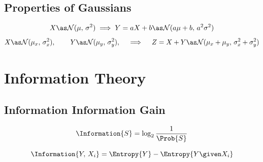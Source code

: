 \documentclass[18pt,a3paper,landscape, ncols=3]{cheatsheet}
\begin{document}
	\subsection{Properties of Gaussians}
		\begin{mdframed}
			\[
				X \as \mathcal{N}(\mu,\, \sigma^2) \implies Y = aX + b \as \mathcal{N}(a\mu + b,\, a^2\sigma^2)
			\]
			\[
				X \as \mathcal{N}(\mu_x,\, \sigma^2_x),\,\qquad Y \as \mathcal{N}(\mu_y,\, \sigma^2_y),\,\quad \implies \quad Z = X + Y \as \mathcal{N}(\mu_x + \mu_y,\, \sigma^2_x + \sigma^2_y)
			\]
		\end{mdframed}


\section{Information Theory} \seperator
	\subsection{Information \qquad\qquad\qquad\qquad\qquad\qquad Information Gain}
		\begin{mdframed}
			\begin{minipage}{0.5\linewidth}
				\[
					\Information{S} = \log_2 \frac{1}{\Prob{S}}
				\]
			\end{minipage}%
			\vrule%
			\begin{minipage}{0.5\linewidth}
				\[
					\Information{Y,\, X_i} = \Entropy{Y} - \Entropy{Y \given X_i}
				\]
			\end{minipage}
		\end{mdframed}
\end{document}
